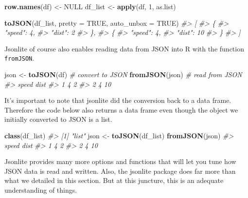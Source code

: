 \documentclass[10pt,]{krantz}
\makeatletter
\newenvironment{Shaded}{\begin{snugshade}}{\end{snugshade}}
\newcommand{\CommentTok}[1]{\textcolor[rgb]{0.37,0.37,0.37}{\textit{#1}}}
\newcommand{\DataTypeTok}[1]{\textcolor[rgb]{0.27,0.27,0.27}{#1}}
\newcommand{\DecValTok}[1]{\textcolor[rgb]{0.06,0.06,0.06}{#1}}
\newcommand{\KeywordTok}[1]{\textcolor[rgb]{0.27,0.27,0.27}{\textbf{#1}}}
\newcommand{\NormalTok}[1]{#1}
\newcommand{\OtherTok}[1]{\textcolor[rgb]{0.37,0.37,0.37}{#1}}
\newcommand{\StringTok}[1]{\textcolor[rgb]{0.5,0.5,0.5}{#1}}
\newenvironment{kframe}{%
\medskip{}
\setlength{\fboxsep}{.8em}
 \def\at@end@of@kframe{}%
 \ifinner\ifhmode%
  \def\at@end@of@kframe{\end{minipage}}%
  \begin{minipage}{\columnwidth}%
 \fi\fi%
 \def\FrameCommand##1{\hskip\@totalleftmargin \hskip-\fboxsep
 \colorbox{shadecolor}{##1}\hskip-\fboxsep
     \hskip-\linewidth \hskip-\@totalleftmargin \hskip\columnwidth}%
 \MakeFramed {\advance\hsize-\width
   \@totalleftmargin\z@ \linewidth\hsize
   \@setminipage}}%
 {\par\unskip\endMakeFramed%
 \at@end@of@kframe}
\renewenvironment{Shaded}{\begin{kframe}}{\end{kframe}}
\makeatother
\begin{document}
\begin{Shaded}
\begin{Highlighting}[]
\KeywordTok{row.names}\NormalTok{(df) <-}\StringTok{ }\OtherTok{NULL}
\NormalTok{df_list <-}\StringTok{ }\KeywordTok{apply}\NormalTok{(df, }\DecValTok{1}\NormalTok{, as.list)}

\KeywordTok{toJSON}\NormalTok{(df_list, }\DataTypeTok{pretty =} \OtherTok{TRUE}\NormalTok{, }\DataTypeTok{auto_unbox =} \OtherTok{TRUE}\NormalTok{)}
\CommentTok{#> [}
\CommentTok{#>   \{}
\CommentTok{#>     "speed": 4,}
\CommentTok{#>     "dist": 2}
\CommentTok{#>   \},}
\CommentTok{#>   \{}
\CommentTok{#>     "speed": 4,}
\CommentTok{#>     "dist": 10}
\CommentTok{#>   \}}
\CommentTok{#> ]}
\end{Highlighting}
\end{Shaded}

Jsonlite of course also enables reading data from JSON into R with the function \texttt{fromJSON}.

\begin{Shaded}
\begin{Highlighting}[]
\NormalTok{json <-}\StringTok{ }\KeywordTok{toJSON}\NormalTok{(df) }\CommentTok{# convert to JSON}
\KeywordTok{fromJSON}\NormalTok{(json) }\CommentTok{# read from JSON}
\CommentTok{#>   speed dist}
\CommentTok{#> 1     4    2}
\CommentTok{#> 2     4   10}
\end{Highlighting}
\end{Shaded}

It's important to note that jsonlite did the conversion back to a data frame. Therefore the code below also returns a data frame even though the object we initially converted to JSON is a list.

\begin{Shaded}
\begin{Highlighting}[]
\KeywordTok{class}\NormalTok{(df_list)}
\CommentTok{#> [1] "list"}
\NormalTok{json <-}\StringTok{ }\KeywordTok{toJSON}\NormalTok{(df_list)}
\KeywordTok{fromJSON}\NormalTok{(json)}
\CommentTok{#>   speed dist}
\CommentTok{#> 1     4    2}
\CommentTok{#> 2     4   10}
\end{Highlighting}
\end{Shaded}

Jsonlite provides many more options and functions that will let you tune how JSON data is read and written. Also, the jsonlite package does far more than what we detailed in this section. But at this juncture, this is an adequate understanding of things.
\end{document}

